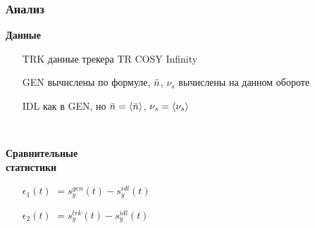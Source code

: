 \documentclass[14pt]{beamer}
\begin{document}
\begin{frame}\frametitle{Анализ}
	\begin{minipage}[t]{.5\linewidth}
		\textbf{Данные}
		\begin{itemize}
			\item[TRK] данные трекера TR COSY Infinity
			\item[GEN] вычислены по формуле, $\bar n$, $\nu_s$ вычислены на данном обороте
			\item[IDL] как в GEN, но $\nbar = \avg{\nbar}$, $\nu_s = \avg{\nu_s}$ 
		\end{itemize}
	\end{minipage}~~~~
	\begin{minipage}[t]{.5\linewidth}
		\textbf{Сравнительные\\ статистики}
		\begin{itemize}
			\item[$\epsilon_1(t)$] $= s_y^{gen}(t) - s_y^{idl}(t)$
			\item[$\epsilon_2(t)$] $= s_y^{trk}(t) - s_y^{idl}(t)$
		\end{itemize}
\end{minipage}
\end{frame}
\end{document}
